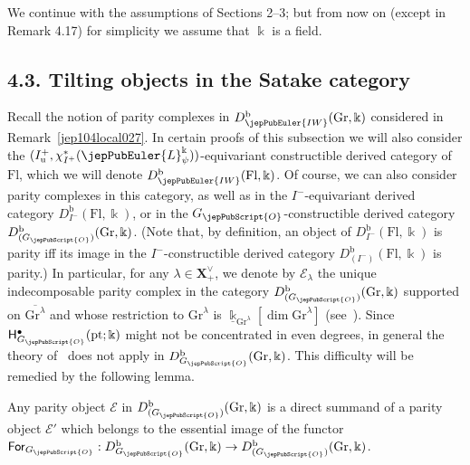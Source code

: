 We continue with the assumptions of Sections 2--3; but from now on (except in Remark 4.17) for simplicity we assume that $\Bbbk$ is a field.
\setcounter{section}{4}
\setcounter{thm}{7}
\subsection*{4.3. Tilting objects in the Satake category}
Recall the notion of parity complexes in $D^{\mathrm b}_{\jepPubEuler{IW}}(\mathrm{Gr},\Bbbk)$ considered in Remark~\ref{jep104local027}.
In certain proofs of this subsection we will also consider the $(I^+_{\mathrm u},\chi_{I^+}^*(\jepPubEuler{L}^{\Bbbk}_{\psi}))$-equivariant constructible derived category of $\mathrm{Fl}$, which we will denote $D^{\mathrm b}_{\jepPubEuler{IW}}(\mathrm{Fl},\Bbbk)$.
Of course, we can also consider parity complexes in this category, as well as in the $I^-$-equivariant derived category $D^{\mathrm b}_{I^-}(\mathrm{Fl},\Bbbk)$, or in the $G_{\jepPubScript{O}}$-constructible derived category $D^{\mathrm b}_{(G_{\jepPubScript{O}})}(\mathrm{Gr},\Bbbk)$.
(Note that, by definition, an object of $D^{\mathrm b}_{I^-}(\mathrm{Fl},\Bbbk)$ is parity iff its image in the $I^-$-constructible derived category $D^{\mathrm b}_{(I^-)}(\mathrm{Fl},\Bbbk)$ is parity.)
In particular, for any $\lambda\in\boldsymbol{X}^{\vee}_+$, we denote by $\mathcal E_{\lambda}$ the unique indecomposable parity complex in the category $D^{\mathrm b}_{(G_{\jepPubScript{O}})}(\mathrm{Gr},\Bbbk)$ supported on $\overline{\mathrm{Gr}^{\lambda}}$ and whose restriction to $\mathrm{Gr}^{\lambda}$ is $\underline{\Bbbk}_{\mathrm{Gr}^{\lambda}}[\dim\mathrm{Gr}^{\lambda}]$ (see~\cite[Th.~2.12 \& \S4.1]{jep104ref31}).
Since $\mathsf H^{\bullet}_{G_{\jepPubScript{O}}}(\mathrm{pt};\Bbbk)$ might not be concentrated in even degrees, in general the theory of~\cite{jep104ref31} does not apply in $D^{\mathrm b}_{G_{\jepPubScript{O}}}(\mathrm{Gr},\Bbbk)$. This difficulty will be remedied by the following lemma.
\begin{lem}\label{jep104new048}
Any parity object $\mathcal E$ in $D^{\mathrm b}_{(G_{\jepPubScript{O}})}(\mathrm{Gr},\Bbbk)$ is a direct summand of a parity object $\mathcal E'$ which belongs to the essential image of the functor $\mathsf{For}_{G_{\jepPubScript{O}}}:D^{\mathrm b}_{G_{\jepPubScript{O}}}(\mathrm{Gr},\Bbbk)\to D^{\mathrm b}_{(G_{\jepPubScript{O}})}(\mathrm{Gr},\Bbbk)$.
\end{lem}

